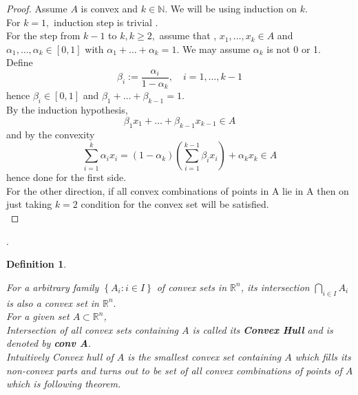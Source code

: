 \documentclass[oneside]{book}
\newtheorem{mydef}{Definition}[section]
\begin{document}
	\begin{proof}
		
		Assume $A$ is convex and $k \in \mathbb{N} .$ We will be using induction on $k$. \\ For $k=1,$ induction step is trivial  .\\
		
		For the step from $k-1$ to $k, k \geq 2,$ assume that  ,  $x_{1}, \ldots, x_{k} \in A$ and \\
		$\alpha_{1}, \ldots, \alpha_{k} \in[0,1]$ with $\alpha_{1}+\ldots+\alpha_{k}=1 .$ We may assume $\alpha_{k}$ is not 0 or 1.\\ Define 
		$$
		\beta_{i}:=\frac{\alpha_{i}}{1-\alpha_{k}}, \quad i=1, \ldots, k-1
		$$
		hence $\beta_{i} \in[0,1]$ and $\beta_{1}+\ldots+\beta_{k-1}=1 .$ \\
		By the induction hypothesis, $$\beta_{1} x_{1}+\ldots+\beta_{k-1} x_{k-1} \in A$$
		and by the convexity
		$$
		\sum_{i=1}^{k} \alpha_{i} x_{i}=\left(1-\alpha_{k}\right)\left(\sum_{i=1}^{k-1} \beta_{i} x_{i}\right)+\alpha_{k} x_{k} \in A
		$$
		hence done for the first side.\\
		
		For the other direction, if all convex combinations of points in A lie in A then on just taking $k =2$ condition for the convex set will be satisfied.\\
		
	\end{proof}.
	
	\begin{mydef}  \label{d:4}
		
		
		For a arbitrary family  $\left\{A_{i}: i \in I\right\}$ of convex sets in   $\mathbb{R}^{n}$, its intersection $\bigcap_{i \in I} A_{i}$ is also a convex set in $\mathbb{R}^{n}.$  \\
		For a given set $A \subset \mathbb{R}^{n}$,\\ Intersection of all convex sets containing $A$ is called its  \textbf{Convex Hull} and is denoted by  \textbf{conv A}.\\
		Intuitively Convex hull of $A$  is the smallest convex set containing $A$ which fills its non-convex parts and turns out to be set of all convex combinations of points of $A$ which is following theorem.
		
	\end{mydef}
	
	
	
\end{document}
